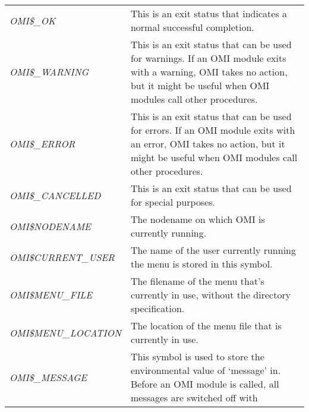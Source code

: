 \documentclass[a4paper]{book}
\begin{document}
\begin{table}[ht]
\begin{minipage}[t]{\textwidth}
\begin{tabular}{lp{9cm}} \hline
\textsl{OMI{\$}{\_}OK}\index{return values}\index{OMI{\$}{\_}OK}\index{OMI symbols!local symbols!OMI{\$}{\_}OK} & 
This is an exit status that indicates a normal successful completion. \\
\textsl{OMI{\$}{\_}WARNING}\index{return values}\index{OMI{\$}{\_}WARNING}\index{OMI symbols!local symbols!OMI{\$}{\_}WARNING} & 
This is an exit status that can be used for warnings. If an 
OMI module exits with a warning, OMI takes no action, but 
it might be useful when OMI modules call other procedures. \\
\textsl{OMI{\$}{\_}ERROR}\index{return values}\index{OMI{\$}{\_}ERROR}\index{OMI symbols!local symbols!OMI{\$}{\_}ERROR} & 
This is an exit status that can be used for errors. If an OMI 
module exits with an error, OMI takes no action, but it 
might be useful when OMI modules call other procedures. \\
\textsl{OMI{\$}{\_}CANCELLED}\index{return values}\index{OMI{\$}{\_}CANCELLED}\index{OMI symbols!local symbols!OMI{\$}{\_}CANCELLED} & 
This is an exit status that can be used for special purposes. \\
\textsl{OMI{\$}NODENAME}\index{nodename}\index{OMI{\$}NODENAME}\index{OMI{\$}NODENAME} & 
The nodename on which OMI is currently running. \\
\textsl{OMI{\$}CURRENT{\_}USER}\index{username}\index{OMI{\$}CURRENT{\_}USER}\index{OMI symbols!local symbols!OMI{\$}CURRENT{\_}USER} & 
The name of the user currently running the menu is stored in this symbol. \\
\textsl{OMI{\$}MENU{\_}FILE}\index{menu!filename}\index{OMI{\$}MENU{\_}FILE}\index{OMI symbols!local symbols!OMI{\$}MENU{\_}FILE} & 
The filename of the menu that's currently in use, without the directory specification. \\
\textsl{OMI{\$}MENU{\_}LOCATION}\index{OMI{\$}MENU{\_}LOCATION}\index{OMI symbols!local symbols!OMI{\$}MENU{\_}LOCATION} & 
The location of the menu file that is currently in use. \\
\textsl{OMI{\$}{\_}MESSAGE}\index{OMI commands in modules!debugging}\index{OMI{\$}{\_}MESSAGE}\index{OMI symbols!local symbols!OMI{\$}{\_}MESSAGE} & 
This symbol is used to store the environmental value of `message' in. Before
an OMI module is called, all messages are switched off with \newline

\end{tabular}
\end{minipage}
\end{table}
\end{document}
